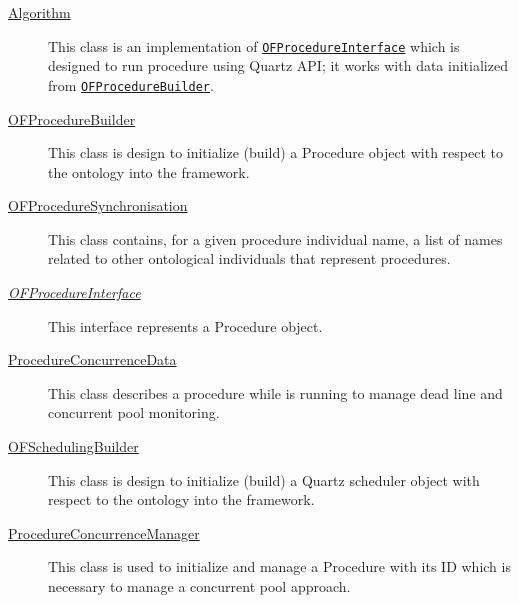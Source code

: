 \begin{description}
\item[{\hyperlink{ontologyFramework.OFProcedureManagment.Algorithm-class}{Algorithm}}]
This class is an implementation of \texttt{\hyperlink{ontologyFramework.OFProcedureManagment.OFProcedureInterface-class}{OFProcedureInterface}}
 which is designed to run procedure using Quartz API;
 it works with data initialized from \texttt{\hyperlink{ontologyFramework.OFProcedureManagment.OFProcedureBuilder-class}{OFProcedureBuilder}}.
\hfill\pageref{ontologyFramework.OFProcedureManagment.Algorithm-class}

\item[{\hyperlink{ontologyFramework.OFProcedureManagment.OFProcedureBuilder-class}{OFProcedureBuilder}}]
This class is design to initialize (build) a Procedure
 object with respect to the ontology into the framework.
\hfill\pageref{ontologyFramework.OFProcedureManagment.OFProcedureBuilder-class}

\item[{\hyperlink{ontologyFramework.OFProcedureManagment.OFProcedureSynchronisation-class}{OFProcedureSynchronisation}}]
This class contains, for a given procedure individual name,
 a list of names related to other ontological individuals that represent
 procedures.
\hfill\pageref{ontologyFramework.OFProcedureManagment.OFProcedureSynchronisation-class}

\item[{\textit{\hyperlink{ontologyFramework.OFProcedureManagment.OFProcedureInterface-class}{OFProcedureInterface}}}]
This interface represents a Procedure object.
\hfill\pageref{ontologyFramework.OFProcedureManagment.OFProcedureInterface-class}

\item[{\hyperlink{ontologyFramework.OFProcedureManagment.ProcedureConcurrenceData-class}{ProcedureConcurrenceData}}]
This class describes a procedure while is running to 
 manage dead line and concurrent pool monitoring.
\hfill\pageref{ontologyFramework.OFProcedureManagment.ProcedureConcurrenceData-class}

\item[{\hyperlink{ontologyFramework.OFProcedureManagment.OFSchedulingBuilder-class}{OFSchedulingBuilder}}]
This class is design to initialize (build) a Quartz scheduler
 object with respect to the ontology into the framework.
\hfill\pageref{ontologyFramework.OFProcedureManagment.OFSchedulingBuilder-class}

\item[{\hyperlink{ontologyFramework.OFProcedureManagment.ProcedureConcurrenceManager-class}{ProcedureConcurrenceManager}}]
This class is used to initialize and manage a Procedure with its ID which
 is necessary to manage a concurrent pool approach.
\hfill\pageref{ontologyFramework.OFProcedureManagment.ProcedureConcurrenceManager-class}

\end{description}
